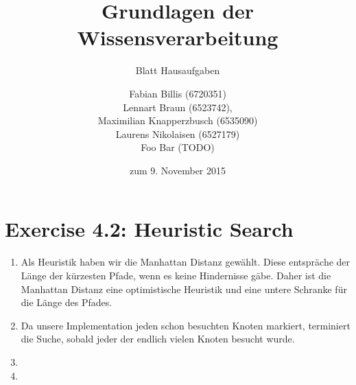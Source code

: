 \documentclass[a4paper]{scrartcl}
\title{Grundlagen der Wissensverarbeitung}
\subtitle{Blatt {\blattnr} Hausaufgaben}
\author{
    Fabian Billis (6720351) \\
    Lennart Braun (6523742), \\
    Maximilian Knapperzbusch (6535090) \\
    Laurens Nikolaisen (6527179) \\
    Foo Bar (TODO)
}
\date{zum 9. November 2015}
\def \blattnr {4}
\begin{document}
\maketitle

\section*{Exercise \blattnr.2: Heuristic Search}

\begin{enumerate}
    \item
        Als Heuristik haben wir die Manhattan Distanz gewählt. Diese entspräche
        der Länge der kürzesten Pfade, wenn es keine Hindernisse gäbe.
        Daher ist die Manhattan Distanz eine optimistische Heuristik und eine
        untere Schranke für die Länge des Pfades.

    \item
        Da unsere Implementation jeden schon besuchten Knoten markiert,
        terminiert die Suche, sobald jeder der endlich vielen Knoten besucht
        wurde.

    \item

    \item

\end{enumerate}
\end{document}
